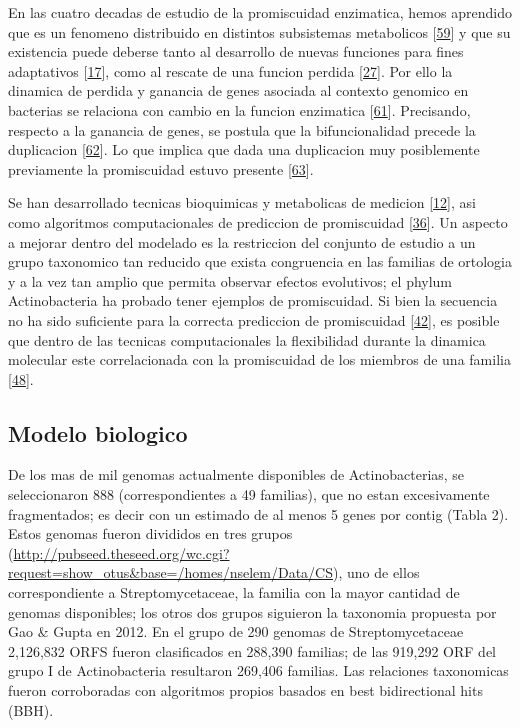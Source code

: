 \documentclass[12pt,twoside]{reedthesis}
\begin{document}
  En las cuatro decadas de estudio de la promiscuidad enzimatica, hemos
  aprendido que es un fenomeno distribuido en distintos subsistemas
  metabolicos {[}\protect\hyperlink{ref-nam_network_2012}{59}{]} y que su
  existencia puede deberse tanto al desarrollo de nuevas funciones para
  fines adaptativos {[}\protect\hyperlink{ref-jensen_enzyme_1976}{17}{]},
  como al rescate de una funcion perdida
  {[}\protect\hyperlink{ref-patrick_multicopy_2007}{27}{]}. Por ello la
  dinamica de perdida y ganancia de genes asociada al contexto genomico en
  bacterias se relaciona con cambio en la funcion enzimatica
  {[}\protect\hyperlink{ref-zhao_discovery_2013}{61}{]}. Precisando,
  respecto a la ganancia de genes, se postula que la bifuncionalidad
  precede la duplicacion
  {[}\protect\hyperlink{ref-hughes_evolution_1994}{62}{]}. Lo que implica
  que dada una duplicacion muy posiblemente previamente la promiscuidad
  estuvo presente {[}\protect\hyperlink{ref-gerlt_divergent_2001}{63}{]}.
  
  Se han desarrollado tecnicas bioquimicas y metabolicas de medicion
  {[}\protect\hyperlink{ref-nath_quantitative_2008}{12}{]}, asi como
  algoritmos computacionales de prediccion de promiscuidad
  {[}\protect\hyperlink{ref-carbonell_molecular_2010}{36}{]}. Un aspecto a
  mejorar dentro del modelado es la restriccion del conjunto de estudio a
  un grupo taxonomico tan reducido que exista congruencia en las familias
  de ortologia y a la vez tan amplio que permita observar efectos
  evolutivos; el phylum Actinobacteria ha probado tener ejemplos de
  promiscuidad. Si bien la secuencia no ha sido suficiente para la
  correcta prediccion de promiscuidad
  {[}\protect\hyperlink{ref-verdel-aranda_molecular_2015}{42}{]}, es
  posible que dentro de las tecnicas computacionales la flexibilidad
  durante la dinamica molecular este correlacionada con la promiscuidad de
  los miembros de una familia
  {[}\protect\hyperlink{ref-james_conformational_2003}{48}{]}.
  
  \subsection{Modelo biologico}\label{modelo-biologico}
  
  De los mas de mil genomas actualmente disponibles de Actinobacterias, se
  seleccionaron 888 (correspondientes a 49 familias), que no estan
  excesivamente fragmentados; es decir con un estimado de al menos 5 genes
  por contig (Tabla 2). Estos genomas fueron divididos en tres grupos
  (\url{http://pubseed.theseed.org/wc.cgi?request=show_otus\&base=/homes/nselem/Data/CS}),
  uno de ellos correspondiente a Streptomycetaceae, la familia con la
  mayor cantidad de genomas disponibles; los otros dos grupos siguieron la
  taxonomia propuesta por Gao \& Gupta en 2012. En el grupo de 290 genomas
  de Streptomycetaceae 2,126,832 ORFS fueron clasificados en 288,390
  familias; de las 919,292 ORF del grupo I de Actinobacteria resultaron
  269,406 familias. Las relaciones taxonomicas fueron corroboradas con
  algoritmos propios basados en best bidirectional hits (BBH).
  
\end{document}
